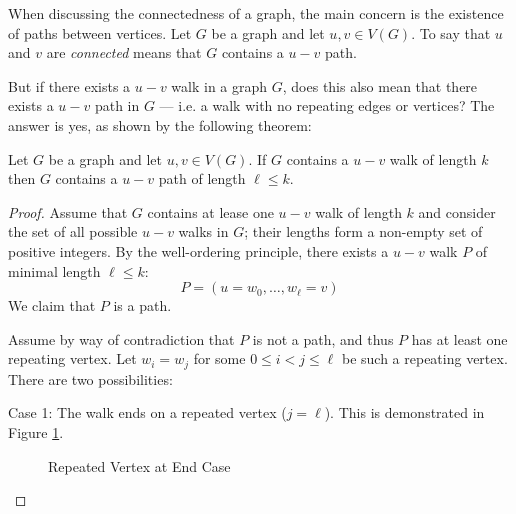 When discussing the connectedness of a graph, the main concern is the existence of paths between vertices.  Let
\(G\) be a graph and let \(u,v\in V(G)\).  To say that \(u\) and \(v\) are \emph{connected} means that \(G\)
contains a \(u-v\) path.

But if there exists a \(u-v\) walk in a graph \(G\), does this also mean that there exists a \(u-v\) path in \(G\)
--- i.e. a walk with no repeating edges or vertices?  The answer is yes, as shown by the following theorem:

\begin{theorem}
  Let \(G\) be a graph and let \(u,v\in V(G)\).  If \(G\) contains a \(u-v\) walk of length \(k\) then \(G\)
  contains a \(u-v\) path of length \(\ell\le k\).
\end{theorem}

\begin{proof}
  Assume that \(G\) contains at lease one \(u-v\) walk of length \(k\) and consider the set of all possible \(u-v\)
  walks in \(G\); their lengths form a non-empty set of positive integers.  By the well-ordering principle, there
  exists a \(u-v\) walk \(P\) of minimal length \(\ell\le k\):
  \[P=(u=w_0,\ldots,w_{\ell}=v)\]
  We claim that \(P\) is a path.

  Assume by way of contradiction that \(P\) is not a path, and thus \(P\) has at least one repeating vertex.  Let
  \(w_i=w_j\) for some \(0\le i<j\le\ell\) be such a repeating vertex.  There are two possibilities:
  
  \begin{description}
  \item Case 1: The walk ends on a repeated vertex (\(j=\ell\)).  This is demonstrated in Figure \ref{fig:rend}.

    \begin{figure}[h]
      \label{fig:rend}
      \begin{center}
      \end{center}
      \caption{Repeated Vertex at End Case}
    \end{figure}


\end{description}
\end{proof}
